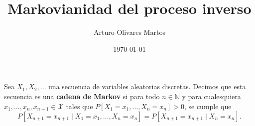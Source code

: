 \documentclass[12pt]{article}
\author{Arturo Olivares Martos}
\title{Markovianidad del proceso inverso}
\date{\today}
\begin{document}
\maketitle

\begin{definicion}
Sea $X_1, X_2, \ldots$ una secuencia de variables aleatorias discretas. Decimos que esta secuencia es una \textbf{cadena de Markov} si para todo $n \in \mathbb{N}$ y para cualesquiera $x_1, \ldots, x_n, x_{n+1} \in \mathcal{X}$ tales que $P[X_1 = x_1, \ldots, X_n = x_n] > 0$, se cumple que
\begin{equation*}
P[X_{n+1} = x_{n+1} \mid X_1 = x_1, \ldots, X_n = x_n] = P[X_{n+1} = x_{n+1} \mid X_n = x_n].
\end{equation*}
\end{definicion}
\end{document}
